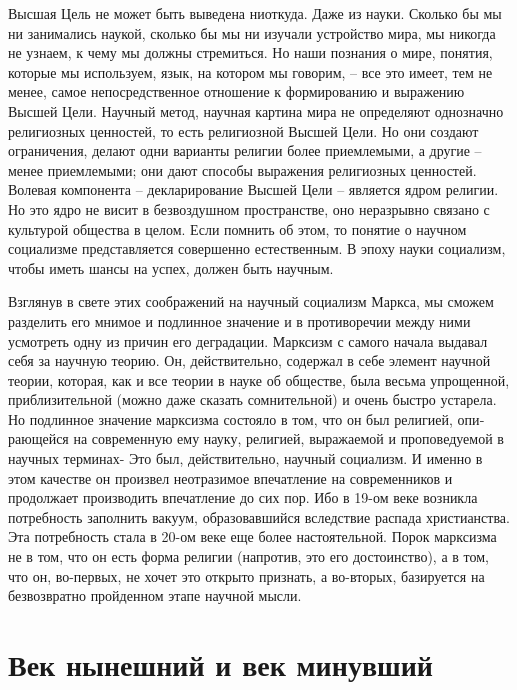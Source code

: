 \documentclass{book}
\begin{document}
Высшая Цель не может быть выведена ниоткуда. Даже из науки. Сколько бы мы ни занимались наукой, сколько бы мы ни изучали устройство мира, мы никогда не узнаем, к чему мы должны  стремиться. Но наши познания о мире, понятия, которые мы используем, язык, на котором мы говорим, -- все это имеет, тем не менее, самое непосредственное отношение к формированию и выражению Высшей Цели. Научный метод, научная картина мира не определяют однозначно религиозных ценностей, то есть религиозной Высшей Цели. Но они создают ограничения, делают одни варианты религии более приемлемыми, а другие -- менее приемлемыми; они дают способы выражения религиозных ценностей. Волевая компонента -- декларирование Высшей Цели -- является ядром религии. Но это ядро не висит в безвоздушном пространстве, оно неразрывно связано с культурой общества в целом. Если помнить об этом, то понятие о научном социализме представляется совершенно естественным. В эпоху науки социализм, чтобы иметь шансы на успех, должен быть научным.

Взглянув в свете этих соображений на научный социализм Маркса, мы сможем разделить его мнимое и подлинное значение и в противоречии между ними усмотреть одну из причин его деградации. Марксизм с самого начала выдавал себя за научную теорию. Он, действительно, содержал в себе элемент научной теории, которая, как и все теории в науке об обществе, была весьма упрощенной, приблизительной (можно даже сказать сомнительной) и очень быстро устарела. Но подлинное значение марксизма состояло в том, что он был религией, опи­рающейся на современную ему науку, религией, выражаемой и проповедуемой в научных терминах- Это был, действительно, научный социализм. И именно в этом качестве он произвел не­отразимое впечатление на современников и продолжает производить впечатление до сих пор. Ибо в 19-ом веке возникла потребность заполнить вакуум, образовавшийся вследствие распада христианства. Эта потребность стала в 20-ом веке еще более настоятельной. Порок марксизма не в том, что он есть форма религии (напротив, это его 
достоинство), а в том, что он, во-первых, не хочет это открыто признать, а во-вторых, базируется на безвозвратно пройденном этапе научной мысли.

\section{Век нынешний и век минувший}
\end{document}
